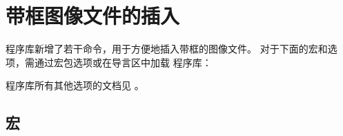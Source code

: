 \clearpage
\section{带框图像文件的插入}\label{sec:includegraphics}%
%
 程序库新增了若干命令，用于方便地插入带框的图像文件。
对于下面的宏和选项，需通过宏包选项或在导言区中加载  程序库：
\begin{dispListing}
\end{dispListing}

 程序库所有其他选项的文档见 。

\subsection{宏}


